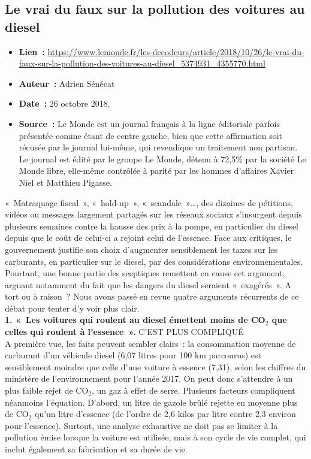 \documentclass[8pt]{article}
\begin{document}
\newpage
\subsection{Le vrai du faux sur la pollution des voitures au diesel}
\label{sec:lemonde_vraifaux}

\begin{itemize}
	\item \textbf{Lien~: } \url{https://www.lemonde.fr/les-decodeurs/article/2018/10/26/le-vrai-du-faux-sur-la-pollution-des-voitures-au-diesel_5374931_4355770.html} 
	\item \textbf{Auteur~: } Adrien Sénécat
	\item \textbf{Date~: } 26 octobre 2018.
	\item \textbf{Source~: } Le Monde est un journal français à la ligne éditoriale parfois présentée comme étant de centre gauche, bien que cette affirmation soit récusée par le journal lui-même, qui revendique un traitement non partisan. Le journal est édité par le groupe Le Monde, détenu à 72,5\% par la société Le Monde libre, elle-même contrôlée à parité par les hommes d'affaires Xavier Niel et Matthieu Pigasse.
\end{itemize}

«~Matraquage fiscal~», «~hold-up~», «~scandale~»…, des dizaines de pétitions, vidéos ou messages largement partagés sur les réseaux sociaux s’insurgent depuis plusieurs semaines contre la hausse des prix à la pompe, en particulier du diesel depuis que le coût de celui-ci a rejoint celui de l’essence.
Face aux critiques, le gouvernement justifie son choix d’augmenter sensiblement les taxes sur les carburants, en particulier sur le diesel, par des considérations environnementales. Pourtant, une bonne partie des sceptiques remettent en cause cet argument, arguant notamment du fait que les dangers du diesel seraient «~exagérés~». A tort ou à raison~? Nous avons passé en revue quatre arguments récurrents de ce débat pour tenter d’y voir plus clair.\\

\textbf{1. «~Les voitures qui roulent au diesel émettent moins de CO$_2$ que celles qui roulent à l’essence~».} C’EST PLUS COMPLIQUÉ\\

A première vue, les faits peuvent sembler clairs~: la consommation moyenne de carburant d’un véhicule diesel (6,07 litres pour 100 km parcourus) est sensiblement moindre que celle d’une voiture à essence (7,31), selon les chiffres du ministère de l’environnement pour l’année 2017. On peut donc s’attendre à un plus faible rejet de CO$_2$, un gaz à effet de serre.
Plusieurs facteurs compliquent néanmoins l’équation. D’abord, un litre de gazole brûlé rejette en moyenne plus de CO$_2$ qu’un litre d’essence (de l’ordre de 2,6 kilos par litre contre 2,3 environ pour l’essence). Surtout, une analyse exhaustive ne doit pas se limiter à la pollution émise lorsque la voiture est utilisée, mais à son cycle de vie complet, qui inclut également sa fabrication et sa durée de vie.\\
\end{document}
